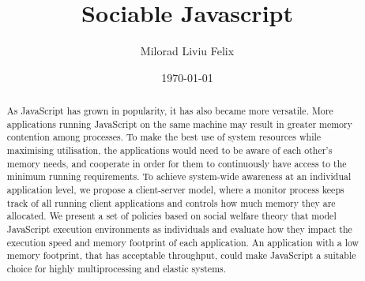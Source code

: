 \documentclass{l4proj}
\begin{document}
\title{Sociable Javascript}
\author{Milorad Liviu Felix}
\date{\today}
\maketitle
\educationalconsent
%
%
\newpage
\begin{abstract}
   As JavaScript has grown in popularity, it has also became more versatile. More applications running JavaScript on the same machine may result in greater memory contention among processes. To make the best use of system resources while maximising utilisation, the applications would need to be aware of each other's memory needs, and cooperate in order for them to continuously have access to the minimum running requirements. To achieve system-wide awareness at an individual application level, we propose a client-server model, where a monitor process keeps track of all running client applications and controls how much memory they are allocated. We present a set of policies based on social welfare theory that model JavaScript execution environments as individuals and evaluate how they impact the execution speed and memory footprint of each application. An application with a low memory footprint, that has acceptable throughput, could make JavaScript a suitable choice for highly multiprocessing and elastic systems.
\end{abstract}
\newpage

\tableofcontents

\newpage
\end{document}
